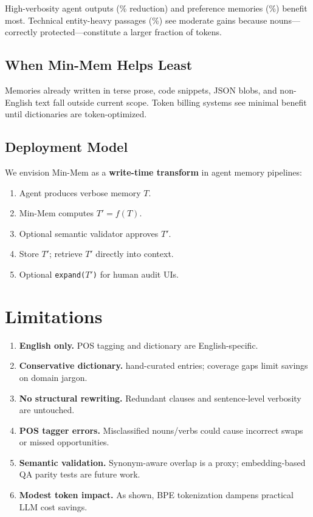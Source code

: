 \documentclass[10pt,twocolumn]{article}
\begin{document}
High-verbosity agent outputs (\CatVerbosity\% reduction) and preference memories (\CatPrefs\%) benefit most. Technical entity-heavy passages (\CatEntity\%) see moderate gains because nouns---correctly protected---constitute a larger fraction of tokens.

\subsection{When Min-Mem Helps Least}

Memories already written in terse prose, code snippets, JSON blobs, and non-English text fall outside current scope. Token billing systems see minimal benefit until dictionaries are token-optimized.

\subsection{Deployment Model}

We envision Min-Mem as a \textbf{write-time transform} in agent memory pipelines:
\begin{enumerate}
    \item Agent produces verbose memory $T$.
    \item Min-Mem computes $T' = f(T)$.
    \item Optional semantic validator approves $T'$.
    \item Store $T'$; retrieve $T'$ directly into context.
    \item Optional \texttt{expand($T'$)} for human audit UIs.
\end{enumerate}

\section{Limitations}

\begin{enumerate}
    \item \textbf{English only.} POS tagging and dictionary are English-specific.
    \item \textbf{Conservative dictionary.} \DictSize{} hand-curated entries; coverage gaps limit savings on domain jargon.
    \item \textbf{No structural rewriting.} Redundant clauses and sentence-level verbosity are untouched.
    \item \textbf{POS tagger errors.} Misclassified nouns/verbs could cause incorrect swaps or missed opportunities.
    \item \textbf{Semantic validation.} Synonym-aware overlap is a proxy; embedding-based QA parity tests are future work.
    \item \textbf{Modest token impact.} As shown, BPE tokenization dampens practical LLM cost savings.
\end{enumerate}
\end{document}
